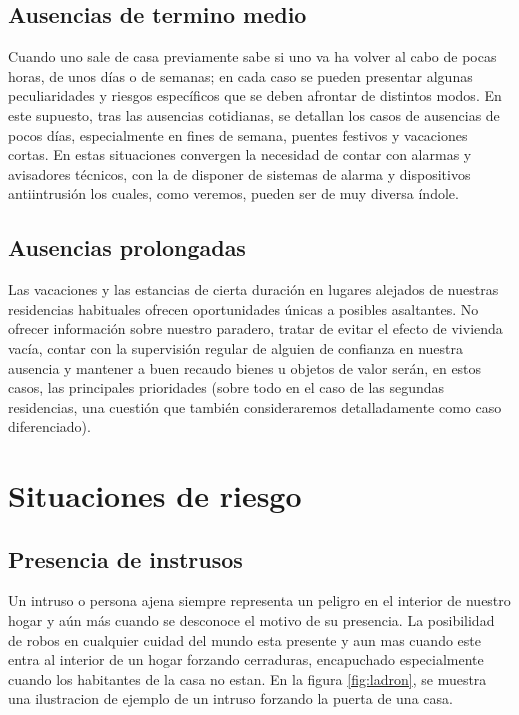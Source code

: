\subsection{Ausencias de termino medio}
Cuando uno sale de casa previamente sabe si uno va ha volver al cabo de pocas horas, de unos días o de semanas; en cada caso se pueden presentar algunas peculiaridades y riesgos específicos que se deben afrontar de distintos modos. En este supuesto, tras las ausencias cotidianas, se detallan los casos de ausencias de pocos días, especialmente en fines de semana, puentes festivos y vacaciones cortas. En estas situaciones convergen la necesidad de contar con alarmas y avisadores técnicos, con la de disponer de sistemas de alarma y dispositivos antiintrusión los cuales, como veremos, pueden ser de muy diversa índole.\\

\subsection{Ausencias prolongadas}
Las vacaciones y las estancias de cierta duración en lugares alejados de nuestras residencias habituales ofrecen oportunidades únicas a posibles asaltantes. No ofrecer información sobre nuestro paradero, tratar de evitar el efecto de vivienda vacía, contar con la supervisión regular de alguien de confianza en nuestra ausencia y mantener a buen recaudo bienes u objetos de valor serán, en estos casos, las principales prioridades (sobre todo en el caso de las segundas residencias, una cuestión que también consideraremos detalladamente como caso diferenciado).\\

\section{Situaciones de riesgo}
\subsection{Presencia de instrusos}
Un intruso o persona ajena siempre representa un peligro en el interior de nuestro hogar y aún más cuando se desconoce el motivo de su presencia. La posibilidad de robos en cualquier cuidad del mundo esta presente y aun mas cuando este entra al interior de un hogar forzando cerraduras, encapuchado especialmente cuando los habitantes de la casa no estan. En la figura \ref{fig:ladron}, se muestra una ilustracion de ejemplo de un intruso forzando la puerta de una casa.\\

